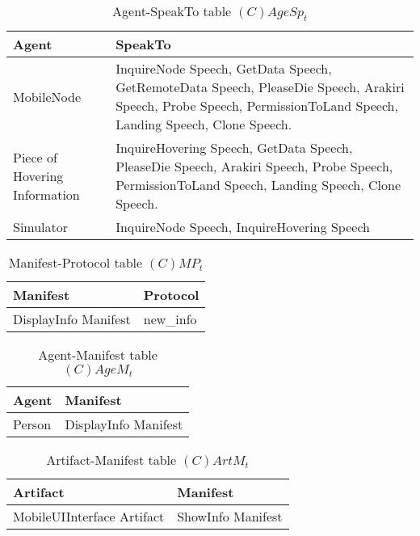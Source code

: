 \begin{table}[H]
	\centering
	\begin{tabular}{|p{4cm}|p{8cm}|}
			\hline
			\textbf{Agent} & \textbf{SpeakTo} \\
			\hline
      MobileNode & InquireNode Speech, GetData Speech, GetRemoteData Speech,
      PleaseDie Speech, Arakiri Speech, Probe Speech, PermissionToLand Speech,
      Landing Speech, Clone Speech. \\
			\hline
      Piece of Hovering Information & InquireHovering Speech, GetData Speech,
      PleaseDie Speech, Arakiri Speech, Probe Speech, PermissionToLand Speech,
      Landing Speech, Clone Speech. \\
			\hline
			Simulator & InquireNode Speech, InquireHovering Speech \\
			\hline
		\end{tabular}
	\caption{Agent-SpeakTo table $(C)AgeSp_t$}
	\label{tab:cagespt}
\end{table}

\begin{table}[H]
	\centering
	\begin{tabular}{|p{4cm}|p{8cm}|}
			\hline
			\textbf{Manifest} & \textbf{Protocol} \\
			\hline
			DisplayInfo Manifest & new\_info \\
			\hline
		\end{tabular}
	\caption{Manifest-Protocol table $(C)MP_t$}
	\label{tab:cmpt}
\end{table}

\begin{table}[H]
	\centering
	\begin{tabular}{|p{4cm}|p{8cm}|}
			\hline
			\textbf{Agent} & \textbf{Manifest} \\
			\hline
			Person & DisplayInfo Manifest\\
			\hline
		\end{tabular}
	\caption{Agent-Manifest table $(C)AgeM_t$}
	\label{tab:cagemt}
\end{table}

\begin{table}[H]
	\centering
	\begin{tabular}{|p{4cm}|p{8cm}|}
			\hline
			\textbf{Artifact} & \textbf{Manifest} \\
			\hline
			MobileUIInterface Artifact & ShowInfo Manifest\\
			\hline
		\end{tabular}
	\caption{Artifact-Manifest table $(C)ArtM_t$}
	\label{tab:cartmt}
\end{table}

